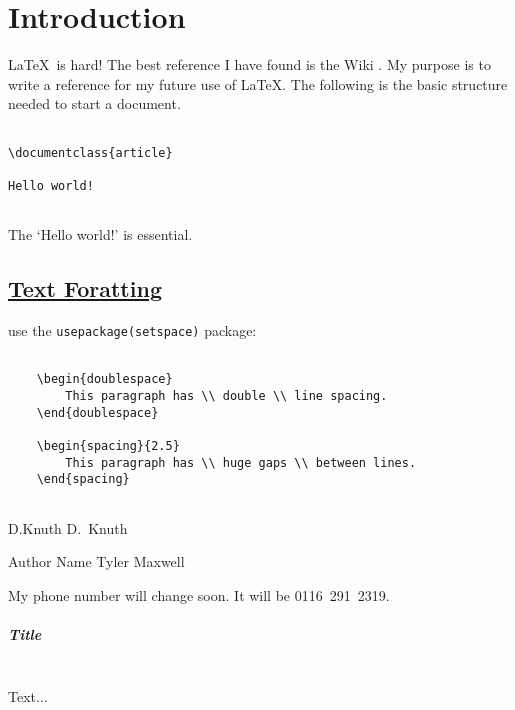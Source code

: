 \chapter*{Introduction}

\LaTeX~is hard! The best reference I have found is the Wiki \autocite[1]{WIKI:1}. My purpose is to write a reference for my future use of \LaTeX{}. The following is the basic structure needed to start a document. 

\begin{verbatim}
    
\documentclass{article}

Hello world!


\end{verbatim}

The `Hello world!' is essential.



\section*{\href{https://en.wikibooks.org/wiki/LaTeX/Text_Formatting}{Text Foratting}}

use the \verb|usepackage(setspace)| package:


\begin{verbatim}
    
    \begin{doublespace}
        This paragraph has \\ double \\ line spacing.
    \end{doublespace}
    
    \begin{spacing}{2.5}
        This paragraph has \\ huge gaps \\ between lines.
    \end{spacing}
    
\end{verbatim}
 

D.Knuth
D.~Knuth

Author Name \hfill Tyler Maxwell

My phone number will change soon. It will be \mbox{0116 291 2319}.

\paragraph{Title} ~\\
Text...